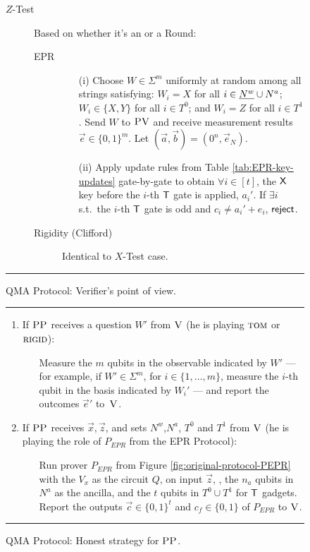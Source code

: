\begin{figure}[H]
\begin{description}
\item[$Z$-Test] Based on whether it's an  or a  Round:
\begin{description}
	\item[EPR] 
	\begin{enumerate}
		\item[(i)] Choose $W\in\Sigma^m$ uniformly at random among all strings
      satisfying: $W_i=X$ for all $i\in \highlight{N^w} \cup N^a$; $W_i\in\{X,Y\}$ for all $i\in T^0$; and $W_i=Z$ for all $i\in T^1$. Send $W$ to $\textsc{PV}$ and receive measurement results $\vec{e}\in\{0,1\}^m$. Let $(\vec{a},\vec{b})=(0^n,\vec{e}_N)$.
		\item[(ii)] Apply update rules from Table \ref{tab:EPR-key-updates} gate-by-gate to obtain $\forall i\in [t]$, the $\sf X$ key before the $i$-th $\sf T$ gate is applied, $a_i'$. 
If $\exists i$ s.t.\ the $i$-th $\sf T$ gate is odd and $c_i\neq a_i'+e_i$, $\sf reject$. 
	\end{enumerate}
	\item[Rigidity (Clifford)] Identical to $X$-Test case.
\end{description}
\end{description}
\rule[2ex]{\textwidth}{0.5pt}\vspace{-.5cm}
\caption{QMA Protocol: Verifier's point of view.}\label{fig:qma-protocol-V}
\end{figure}


\begin{figure}[H]
\rule[1ex]{\textwidth}{0.5pt}
\vspace{-20pt}
\begin{enumerate}
  \item If $\textsc{PP}$ receives a question ${W}'$ from $\textsc{V}$ (he is playing $\textsc{tom}$ or $\textsc{rigid}$):
\begin{enumerate}
     \item[]  Measure the $m$ qubits in the observable indicated by $W'$ --- for example, if $W'\in\Sigma^m$, for $i\in \{1,\ldots,m\}$, measure the $i$-th qubit in the basis indicated by $W_i'$ --- and report
       the outcomes $\vec{e}'$ to~$\textsc{V}$.
\end{enumerate}
\item If $\textsc{PP}$ receives $\vec{x}, \vec{z}$, and sets $N^w$,$N^a$, $T^0$ and $T^1$ from $\textsc{V}$ (he is playing the role of $P_{EPR}$ from the EPR Protocol):
\begin{enumerate}
     \item[] Run  prover $P_{EPR}$ from Figure
       \ref{fig:original-protocol-PEPR} with the $V_x$ as the circuit $Q$, on input $\vec{z}$, , the $n_a$ qubits in 
        $N^a$ as the ancilla, and the $t$ qubits in $T^0\cup T^1$ for $\sf T$ gadgets.
     Report the outputs $\vec{c}\in\{0,1\}^t$ and $c_f\in\{0,1\}$ of $P_{EPR}$  to $\textsc{V}$. 
\end{enumerate}
\end{enumerate}
\rule[2ex]{\textwidth}{0.5pt}\vspace{-.5cm}
\caption{QMA Protocol: Honest strategy for $\textsc{PP}$.}\label{fig:qma-protocol-PP}
\end{figure}


